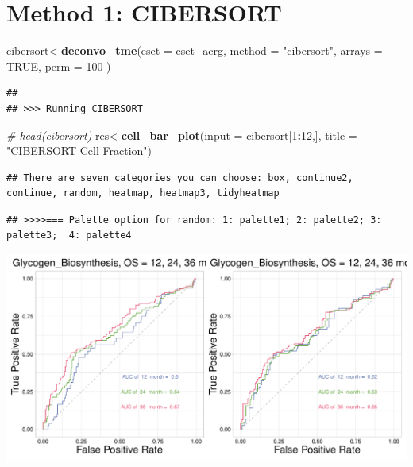 \documentclass[
  12pt,
]{book}
\newenvironment{Shaded}{\begin{snugshade}}{\end{snugshade}}
\newcommand{\AttributeTok}[1]{\textcolor[rgb]{0.13,0.29,0.53}{#1}}
\newcommand{\CommentTok}[1]{\textcolor[rgb]{0.56,0.35,0.01}{\textit{#1}}}
\newcommand{\ConstantTok}[1]{\textcolor[rgb]{0.56,0.35,0.01}{#1}}
\newcommand{\DecValTok}[1]{\textcolor[rgb]{0.00,0.00,0.81}{#1}}
\newcommand{\FunctionTok}[1]{\textcolor[rgb]{0.13,0.29,0.53}{\textbf{#1}}}
\newcommand{\NormalTok}[1]{#1}
\newcommand{\OtherTok}[1]{\textcolor[rgb]{0.56,0.35,0.01}{#1}}
\newcommand{\SpecialCharTok}[1]{\textcolor[rgb]{0.81,0.36,0.00}{\textbf{#1}}}
\newcommand{\StringTok}[1]{\textcolor[rgb]{0.31,0.60,0.02}{#1}}
\theoremstyle{definition}
\theoremstyle{definition}
\theoremstyle{definition}
\theoremstyle{definition}
\theoremstyle{remark}
\begin{document}
\hypertarget{method-1-cibersort}{%
\section{Method 1: CIBERSORT}\label{method-1-cibersort}}

\begin{Shaded}
\begin{Highlighting}[]
\NormalTok{cibersort}\OtherTok{\textless{}{-}}\FunctionTok{deconvo\_tme}\NormalTok{(}\AttributeTok{eset =}\NormalTok{ eset\_acrg, }\AttributeTok{method =} \StringTok{"cibersort"}\NormalTok{, }\AttributeTok{arrays =} \ConstantTok{TRUE}\NormalTok{, }\AttributeTok{perm =} \DecValTok{100}\NormalTok{ )}
\end{Highlighting}
\end{Shaded}

\begin{verbatim}
## 
## >>> Running CIBERSORT
\end{verbatim}

\begin{Shaded}
\begin{Highlighting}[]
\CommentTok{\# head(cibersort)}
\NormalTok{res}\OtherTok{\textless{}{-}}\FunctionTok{cell\_bar\_plot}\NormalTok{(}\AttributeTok{input =}\NormalTok{ cibersort[}\DecValTok{1}\SpecialCharTok{:}\DecValTok{12}\NormalTok{,], }\AttributeTok{title =} \StringTok{"CIBERSORT Cell Fraction"}\NormalTok{)}
\end{Highlighting}
\end{Shaded}

\begin{verbatim}
## There are seven categories you can choose: box, continue2, continue, random, heatmap, heatmap3, tidyheatmap
\end{verbatim}

\begin{verbatim}
## >>>>=== Palette option for random: 1: palette1; 2: palette2; 3: palette3;  4: palette4
\end{verbatim}

\includegraphics{_main_files/figure-latex/unnamed-chunk-50-1.pdf}
\end{document}
